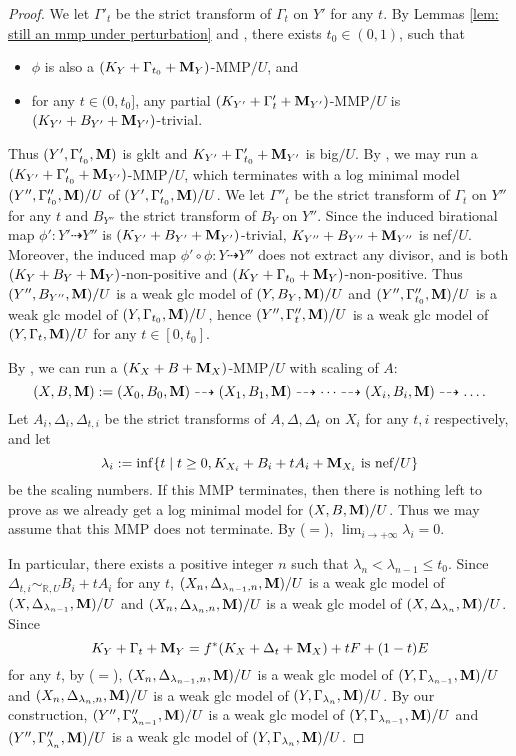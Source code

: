 \documentclass[11pt]{amsart}
\numberwithin{equation}{section}
\newcommand{\Mm}{{\bf{M}}}
\theoremstyle{definition}
\theoremstyle{definition}
\theoremstyle{definition}
\begin{document}
\begin{proof}
We let $\Gamma'_t$ be the strict transform of $\Gamma_t$ on $Y'$ for any $t$. By Lemmas \ref{lem: still an mmp under perturbation} and \cite[Lemma 3.17]{HL18}, there exists $t_0\in (0,1)$, such that 
\begin{itemize}
    \item $\phi$ is also a $(K_Y+\Gamma_{t_0}+\Mm_Y)$-MMP$/U$, and
    \item for any $t\in (0,t_0]$, any partial $(K_{Y'}+\Gamma'_{t}+\Mm_{Y'})$-MMP$/U$ is $(K_{Y'}+B_{Y'}+\Mm_{Y'})$-trivial.
\end{itemize}
Thus $(Y',\Gamma_{t_0}',\Mm)$ is gklt and $K_{Y'}+\Gamma'_{t_0}+\Mm_{Y'}$ is big$/U$. By \cite[Theorem 4.4(2)]{BZ16}, we may run a $(K_{Y'}+\Gamma'_{t_0}+\Mm_{Y'})$-MMP$/U$, which terminates with a log minimal model $(Y'',\Gamma''_{t_0},\Mm)/U$ of $(Y',\Gamma'_{t_0},\Mm)/U$. We let $\Gamma''_t$ be the strict transform of $\Gamma_t$ on $Y''$ for any $t$ and $B_{Y''}$ the strict transform of $B_Y$ on $Y''$. Since the induced birational map $\phi': Y'\dashrightarrow Y''$ is $(K_{Y'}+B_{Y'}+\Mm_{Y'})$-trivial, $K_{Y''}+B_{Y''}+\Mm_{Y''}$ is nef$/U$. Moreover, the induced map $\phi'\circ\phi: Y\dashrightarrow Y''$ does not extract any divisor, and is both $(K_Y+B_Y+\Mm_Y)$-non-positive and $(K_Y+\Gamma_{t_0}+\Mm_Y)$-non-positive. Thus $(Y'',B_{Y''},\Mm)/U$ is a weak glc model of $(Y,B_Y,\Mm)/U$ and $(Y'',\Gamma''_{t_0},\Mm)/U$ is a weak glc model of $(Y,\Gamma_{t_0},\Mm)/U$, hence $(Y'',\Gamma''_t,\Mm)/U$ is a weak glc model of $(Y,\Gamma_t,\Mm)/U$ for any $t\in [0,t_0]$.


By \cite[Lemma 3.5]{HL18}, we can run a $(K_X+B+\Mm_X)$-MMP$/U$ with scaling of $A$:
$$(X,B,\Mm):=(X_0,B_0,\Mm)\dashrightarrow (X_1,B_1,\Mm)\dashrightarrow\dots\dashrightarrow (X_i,B_i,\Mm)\dashrightarrow\dots.$$
Let $A_i,\Delta_i,\Delta_{t,i}$ be the strict transforms of $A,\Delta,\Delta_t$ on $X_i$ for any $t,i$ respectively, and let
$$\lambda_i:=\inf\{t\mid t\geq 0, K_{X_i}+B_i+tA_i+\Mm_{X_i}\text{ is nef/}U\}$$
be the scaling numbers. If this MMP terminates, then there is nothing left to prove as we already get a log minimal model for $(X,B,\Mm)/U$. Thus we may assume that this MMP does not terminate. By \cite[Theorem 2.8]{HL21} ($=$\cite[Version 3, Theorem 2.24]{HL21}), $\lim_{i\rightarrow+\infty}\lambda_i=0$. 

In particular, there exists a positive integer $n$ such that $\lambda_n<\lambda_{n-1}\leq t_0$. Since $\Delta_{t,i}\sim_{\mathbb R,U}B_i+tA_i$ for any $t$, $(X_n,\Delta_{\lambda_{n-1},n},\Mm)/U$ is a weak glc model of $(X,\Delta_{\lambda_{n-1}},\Mm)/U$ and $(X_n,\Delta_{\lambda_{n},n},\Mm)/U$ is a weak glc model of $(X,\Delta_{\lambda_{n}},\Mm)/U$. Since
$$K_Y+\Gamma_t+\Mm_Y=f^*(K_X+\Delta_t+\Mm_X)+tF+(1-t)E$$
for any $t$, by \cite[Lemma 3.10(1)]{HL21} ($=$\cite[Version 3, Lemma 3.17]{HL21}), $(X_n,\Delta_{\lambda_{n-1},n},\Mm)/U$ is a weak glc model of $(Y,\Gamma_{\lambda_{n-1}},\Mm)/U$ and $(X_n,\Delta_{\lambda_{n},n},\Mm)/U$ is a weak glc model of $(Y,\Gamma_{\lambda_{n}},\Mm)/U$. By our construction, $(Y'',\Gamma''_{\lambda_{n-1}},\Mm)/U$ is a weak glc model of $(Y,\Gamma_{\lambda_{n-1}},\Mm)/U$ and $(Y'',\Gamma''_{\lambda_{n}},\Mm)/U$ is a weak glc model of $(Y,\Gamma_{\lambda_{n}},\Mm)/U$.


\end{proof}
\end{document}
